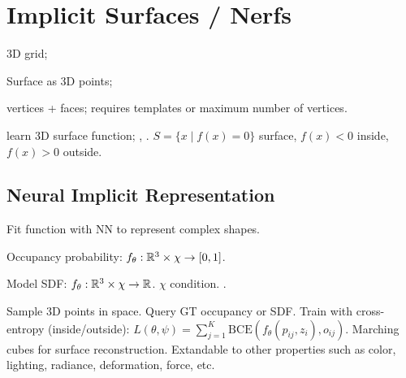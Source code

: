 \section{Implicit Surfaces / Nerfs}
\begin{definition}[Voxels]
    3D grid; 
\end{definition}

\begin{definition}[Points]
    Surface as 3D points; 
\end{definition}

\begin{definition}[Meshes]
    vertices + faces; requires templates or maximum number of vertices. 
\end{definition}

\begin{definition}[Implicit]
    learn 3D surface function; , . \(S = \{x \mid f(x) = 0\}\) surface, \(f(x) < 0\) inside, \(f(x) > 0 \) outside.
\end{definition}

\subsection{Neural Implicit Representation}
Fit function with NN to represent complex shapes.

\begin{definition}
    Occupancy probability: \(f_\theta: \mathbb{R}^3 \times \chi \to [0, 1]\).
\end{definition}

\begin{definition}[DeepSDF]
    Model SDF: \(f_\theta: \mathbb{R}^3 \times \chi \to \mathbb{R}\). \(\chi\) condition.
    .
\end{definition}

\begin{definition}
    Sample 3D points in space. Query GT occupancy or SDF. Train with cross-entropy (inside/outside):
    \(L(\theta, \psi) = \sum_{j=1}^K \text{BCE}(f_\theta(p_{ij}, z_i), o_{ij})\).
    Marching cubes for surface reconstruction. Extandable to other properties such as color, lighting, radiance, deformation, force, etc.
\end{definition}

